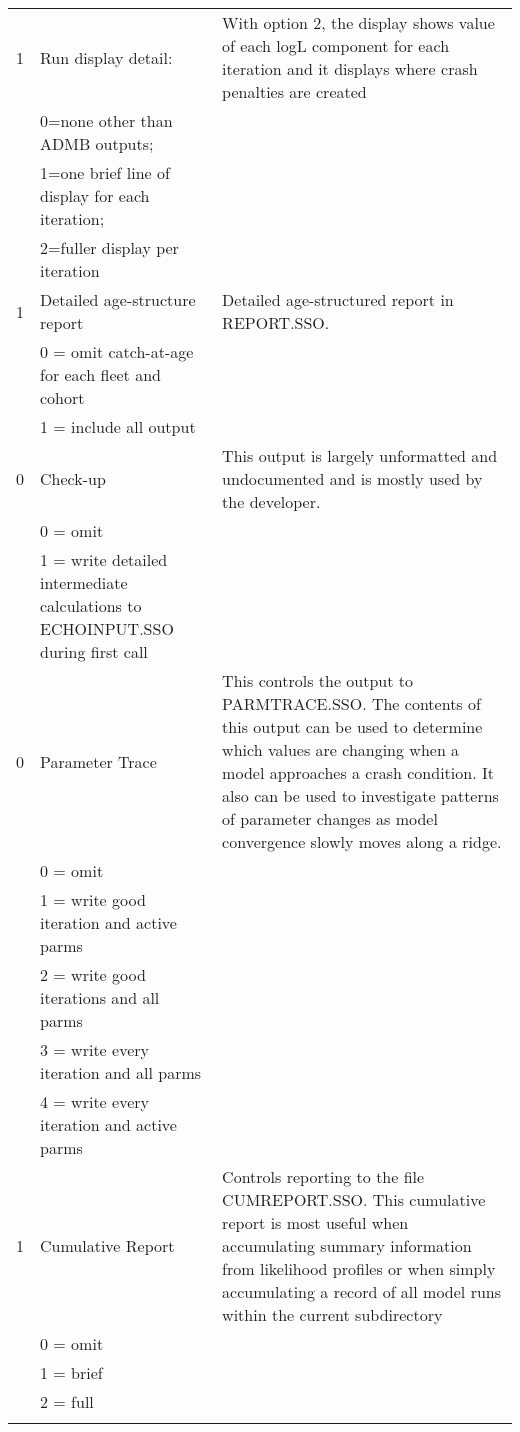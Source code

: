 \begin{landscape}
\begin{longtable}{p{3cm} p{7cm} p{11cm}}
 \hline
 1 & Run display detail: &  \multirow{1}{1cm}[-0.1cm]{\parbox{11cm}{With option 2, the display shows value of each logL component for each iteration and it displays where crash penalties are created}} \\
   & 0=none other than ADMB outputs; & \\
   & 1=one brief line of display for each iteration; & \\
   & 2=fuller display per iteration & \\
		  
 \hline
 1 & Detailed age-structure report & \multirow{1}{1cm}[-0.1cm]{\parbox{11cm}{Detailed age-structured report in REPORT.SSO.}} \\
   & 0 = omit catch-at-age for each fleet and cohort & \\
   & 1 = include all output &  \\
		  
 \hline
 0 & Check-up & \multirow{1}{1cm}[-0.1cm]{\parbox{11cm}{This output is largely unformatted and undocumented and is mostly used by the developer. }}\\
   & 0 = omit & \\
   & 1 = write detailed intermediate calculations to ECHOINPUT.SSO during first call & \\

 \pagebreak		
 0 & Parameter Trace & \multirow{1}{1cm}[-0.1cm]{\parbox{11cm}{This controls the output to PARMTRACE.SSO. The contents of this output can be used to determine which values are changing when a model approaches a crash condition.  It also can be used to investigate patterns of parameter changes as model convergence slowly moves along a ridge.}} \\
   & 0 = omit & \\
   & 1 = write good iteration and active parms & \\
   & 2 = write good iterations and all parms & \\
   & 3 = write every iteration and all parms & \\
   & 4 = write every iteration and active parms &  \\
   
 \hline
 1 & Cumulative Report & \multirow{1}{1cm}[-0.1cm]{\parbox{11cm}{Controls reporting to the file CUMREPORT.SSO.
 		This cumulative report is most useful when accumulating summary information from likelihood profiles or when simply accumulating a record of all model runs within the current subdirectory}}\\
   & 0 = omit  & \\
   & 1 = brief & \\
   & 2 = full  &  \\
   & & \\
	 

\end{longtable}
\end{landscape}
